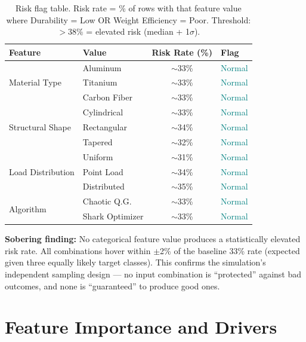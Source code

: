 \documentclass[11pt, a4paper]{report}
\begin{document}
\begin{table}[H]
\centering
\caption{Risk flag table. Risk rate = \% of rows with that feature value where Durability = Low OR Weight Efficiency = Poor. Threshold: $> 38\%$ = elevated risk (median + 1$\sigma$).}
\label{tab:risk_flags}
\footnotesize
\begin{tabular}{llcl}
\toprule
\textbf{Feature} & \textbf{Value} & \textbf{Risk Rate (\%)} & \textbf{Flag} \\
\midrule
\multirow{3}{*}{Material Type}
  & Aluminum    & $\sim$33\% & \textcolor{teal}{Normal} \\
  & Titanium    & $\sim$33\% & \textcolor{teal}{Normal} \\
  & Carbon Fiber & $\sim$33\% & \textcolor{teal}{Normal} \\
\midrule
\multirow{3}{*}{Structural Shape}
  & Cylindrical & $\sim$33\% & \textcolor{teal}{Normal} \\
  & Rectangular & $\sim$34\% & \textcolor{teal}{Normal} \\
  & Tapered     & $\sim$32\% & \textcolor{teal}{Normal} \\
\midrule
\multirow{3}{*}{Load Distribution}
  & Uniform     & $\sim$31\% & \textcolor{teal}{Normal} \\
  & Point Load  & $\sim$34\% & \textcolor{teal}{Normal} \\
  & Distributed & $\sim$35\% & \textcolor{teal}{Normal} \\
\midrule
\multirow{2}{*}{Algorithm}
  & Chaotic Q.G.   & $\sim$33\% & \textcolor{teal}{Normal} \\
  & Shark Optimizer & $\sim$33\% & \textcolor{teal}{Normal} \\
\bottomrule
\end{tabular}
\end{table}

\begin{riskbox}
\textbf{Sobering finding:} No categorical feature value produces a statistically elevated risk rate. All combinations hover within $\pm$2\% of the baseline 33\% rate (expected given three equally likely target classes). This confirms the simulation's independent sampling design --- no input combination is ``protected'' against bad outcomes, and none is ``guaranteed'' to produce good ones.
\end{riskbox}

\section{Feature Importance and Drivers}
\end{document}
